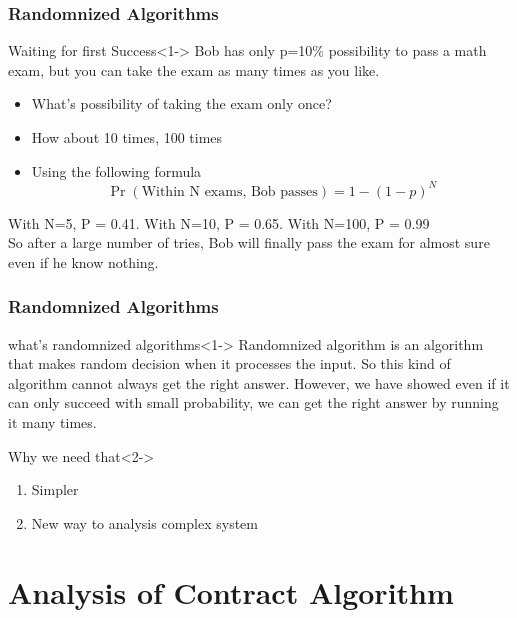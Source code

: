 \documentclass{beamer}
\begin{document}
\begin{frame}
\frametitle{Randomnized Algorithms }
\begin{block}{Waiting for first Success}<1->
Bob has only p=10\% possibility to pass a math exam, but you can take the exam as many times as you like. 
\begin{itemize}
	\item What's possibility of taking the exam only once?
	\item How about 10 times, 100 times 
\end{itemize}
\end{block}
\begin{itemize}
	\item Using the following formula 
	\begin{equation*}
	\Pr\left(\text{Within N exams, Bob passes}\right)=1-(1-p)^N
	\end{equation*}
\end{itemize}
With N=5, P = 0.41. With N=10, P = 0.65.
With N=100, P = 0.99 \\
So after a large number of tries, Bob will finally pass the exam for almost sure even if he know nothing.

\end{frame}
\begin{frame}
\frametitle{Randomnized Algorithms}
\begin{block}{ what's randomnized algorithms}<1->
Randomnized algorithm is an algorithm that makes random decision when it processes the input. So this kind of algorithm cannot always get the right answer.
However, we have showed even if it can only succeed with small probability, we can get the right answer by running it many times. 	
\end{block}
\begin{block}{Why we need that}<2->
\begin{enumerate}
	\item Simpler
	\item New way to analysis complex system
\end{enumerate}
\end{block}
\end{frame}
\section{Analysis of Contract Algorithm}

\end{document}
